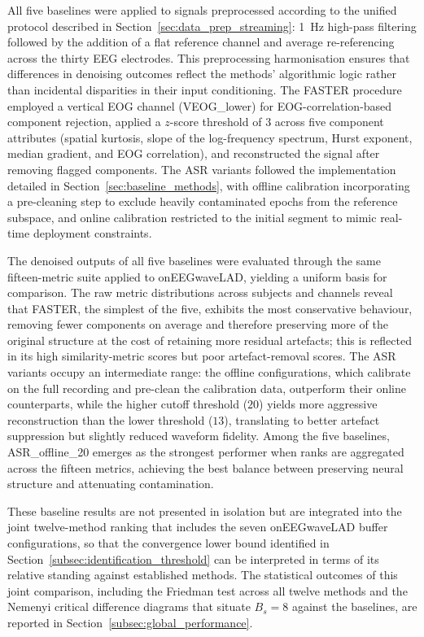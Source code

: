 \documentclass[MScCS,12pt,oneside,final]{uccthesis}
\begin{document}
All five baselines were applied to signals preprocessed according to the unified protocol described in Section~\ref{sec:data_prep_streaming}: 1~Hz high-pass filtering followed by the addition of a flat reference channel and average re-referencing across the thirty EEG electrodes. This preprocessing harmonisation ensures that differences in denoising outcomes reflect the methods' algorithmic logic rather than incidental disparities in their input conditioning. The FASTER procedure employed a vertical EOG channel (VEOG\_lower) for EOG-correlation-based component rejection, applied a $z$-score threshold of $3$ across five component attributes (spatial kurtosis, slope of the log-frequency spectrum, Hurst exponent, median gradient, and EOG correlation), and reconstructed the signal after removing flagged components. The ASR variants followed the implementation detailed in Section~\ref{sec:baseline_methods}, with offline calibration incorporating a pre-cleaning step to exclude heavily contaminated epochs from the reference subspace, and online calibration restricted to the initial segment to mimic real-time deployment constraints.

The denoised outputs of all five baselines were evaluated through the same fifteen-metric suite applied to onEEGwaveLAD, yielding a uniform basis for comparison. The raw metric distributions across subjects and channels reveal that FASTER, the simplest of the five, exhibits the most conservative behaviour, removing fewer components on average and therefore preserving more of the original structure at the cost of retaining more residual artefacts; this is reflected in its high similarity-metric scores but poor artefact-removal scores. The ASR variants occupy an intermediate range: the offline configurations, which calibrate on the full recording and pre-clean the calibration data, outperform their online counterparts, while the higher cutoff threshold ($20$) yields more aggressive reconstruction than the lower threshold ($13$), translating to better artefact suppression but slightly reduced waveform fidelity. Among the five baselines, ASR\_offline\_20 emerges as the strongest performer when ranks are aggregated across the fifteen metrics, achieving the best balance between preserving neural structure and attenuating contamination.

These baseline results are not presented in isolation but are integrated into the joint twelve-method ranking that includes the seven onEEGwaveLAD buffer configurations, so that the convergence lower bound identified in Section~\ref{subsec:identification_threshold} can be interpreted in terms of its relative standing against established methods. The statistical outcomes of this joint comparison, including the Friedman test across all twelve methods and the Nemenyi critical difference diagrams that situate $B_s = 8$ against the baselines, are reported in Section~\ref{subsec:global_performance}.
\end{document}
